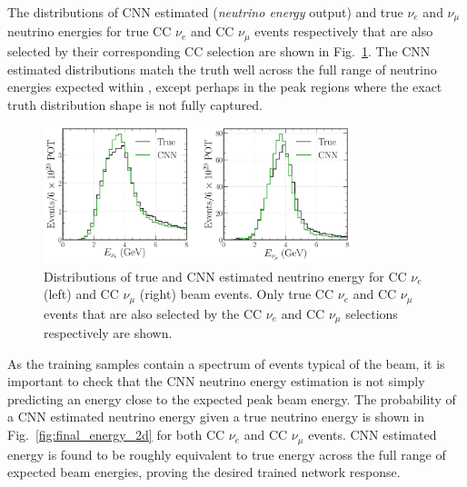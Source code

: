 The distributions of CNN estimated (\emph{neutrino energy} output) and true $\nu_{e}$ and
$\nu_{\mu}$ neutrino energies for true CC $\nu_{e}$ and CC $\nu_{\mu}$ events respectively that
are also selected by their corresponding CC selection are shown in
Fig.~\ref{fig:final_energy_dists}. The CNN estimated distributions match the truth well across the
full range of neutrino energies expected within \chipsfive, except perhaps in the peak regions
where the exact truth distribution shape is not fully captured.

\begin{figure} %
    \includegraphics[width=0.8\textwidth]{diagrams/6-cvn/chipsnet/final_energy_dists.pdf}
    \caption[Distributions of true and CNN estimated neutrino energy.]
    {Distributions of true and CNN estimated neutrino energy for CC $\nu_{e}$ (left) and CC
        $\nu_{\mu}$ (right) beam events. Only true CC $\nu_{e}$ and CC $\nu_{\mu}$ events that are
        also selected by the CC $\nu_{e}$ and CC $\nu_{\mu}$ selections respectively are shown.}
    \label{fig:final_energy_dists}
\end{figure}

As the training samples contain a spectrum of events typical of the beam, it is important to check
that the CNN neutrino energy estimation is not simply predicting an energy close to the expected
peak beam energy. The probability of a CNN estimated neutrino energy given a true neutrino energy
is shown in Fig.~\ref{fig:final_energy_2d} for both CC $\nu_{e}$ and CC $\nu_{\mu}$ events. CNN
estimated energy is found to be roughly equivalent to true energy across the full range of
expected \chipsfive beam energies, proving the desired trained network response.

